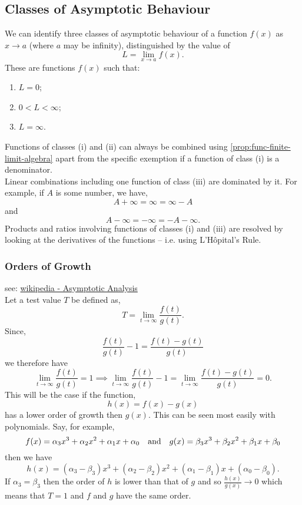 \documentclass[../MathsNotesBase.tex]{subfiles}
\begin{document}
{		 
		\biggerskip
		\subsection{Classes of Asymptotic Behaviour}
		We can identify three classes of asymptotic behaviour of a function $f(x)$ as ${ x \to a }$ (where $a$ may be infinity), distinguished by the value of
		\[ L = \lim_{x \to a} f(x). \]
		These are functions $f(x)$ such that:
		\begin{enumerate}[label=(\roman*)]
			\item{${ L = 0 }$;}
			\item{${ 0 < L < \infty }$;}
			\item{${ L = \infty }$.}
		\end{enumerate}
	
		Functions of classes (i) and (ii) can always be combined using \autoref{prop:func-finite-limit-algebra} apart from the specific exemption if a function of class (i) is a denominator.\\
		Linear combinations including one function of class (iii) are dominated by it. For example, if $A$ is some number, we have,
		\[  A + \infty = \infty = \infty - A \]
		and
		\[ A - \infty = -\infty = -A - \infty. \]
		Products and ratios involving functions of classes (i) and (iii) are resolved by looking at the derivatives of the functions -- i.e. using L'H\^{o}pital's Rule.
		
		\medskip
		\subsubsection{Orders of Growth}
		see: \href{https://en.wikipedia.org/wiki/Asymptotic_analysis}{wikipedia - Asymptotic Analysis}\\
		
		Let a test value $T$ be defined as,
		\[ T = \lim_{t \to \infty} \frac{f(t)}{g(t)}. \]
		Since,
		\[ \frac{f(t)}{g(t)} - 1 = \frac{f(t) - g(t)}{g(t)} \]
		we therefore have
		\[ \lim_{t \to \infty} \frac{f(t)}{g(t)} = 1 \implies \lim_{t \to \infty} \frac{f(t)}{g(t)} - 1 = \lim_{t \to \infty} \frac{f(t) - g(t)}{g(t)} = 0. \]
		This will be the case if the function,
		\[ h(x) = f(x) - g(x) \]
		has a lower order of growth then $g(x)$. This can be seen most easily with polynomials. Say, for example,
		\[ f(x) = \alpha_3 x^3 + \alpha_2 x^2 + \alpha_1 x + \alpha_0 \hspace{10pt}\text{and}\hspace{10pt} g(x) = \beta_3 x^3 + \beta_2 x^2 + \beta_1 x + \beta_0 \]
		then we have
		\[ h(x) = (\alpha_3 - \beta_3) x^3 + (\alpha_2 - \beta_2) x^2 + (\alpha_1 - \beta_1) x + (\alpha_0 - \beta_0). \]
		If ${ \alpha_3 = \beta_3 }$ then the order of $h$ is lower than that of $g$ and so ${ \frac{h(x)}{g(x)} \to 0 }$ which means that ${ T = 1 }$ and $f$ and $g$ have the same order.\\
		
}
\end{document}
